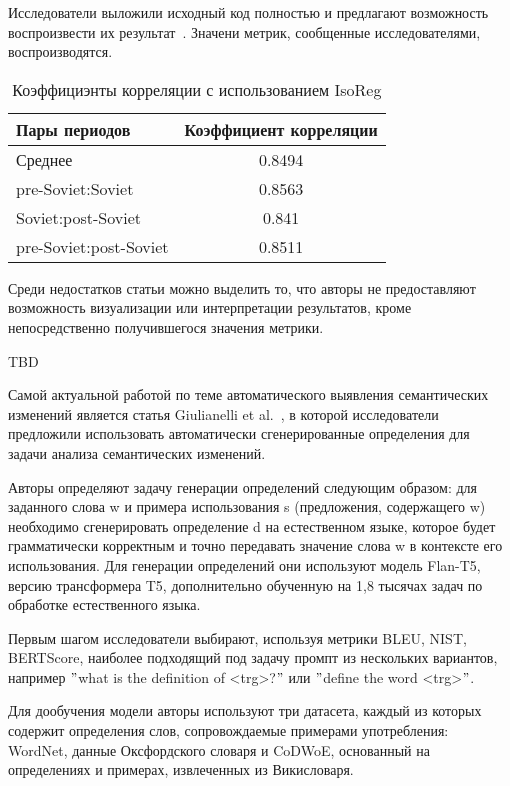 \documentclass[LI,VKR]{HSEUniversity}
\begin{document}
Исследователи выложили исходный код полностью и предлагают возможность воспроизвести их
результат~\cite{DeepMistakeGitHub}.
Значени метрик, сообщенные исследователями, воспроизводятся.

\begin{table}[htbp]
\centering
\caption{Коэффициэнты корреляции с использованием IsoReg}
\begin{tabular}{lc}
\hline
Пары периодов                  & Коэффициент корреляции \\
\hline
Среднее            & 0.8494                  \\
pre-Soviet:Soviet           & 0.8563                  \\
Soviet:post-Soviet          & 0.841                  \\
pre-Soviet:post-Soviet      & 0.8511                  \\
\hline
\end{tabular}
\end{table}

Среди недостатков статьи можно выделить то, что авторы не предоставляют возможность визуализации
или интерпретации результатов, кроме непосредственно получившегося значения метрики.

TBD

Самой актуальной работой по теме автоматического выявления семантических изменений является статья
Giulianelli et al.~\cite{DefinitionGenerationMainArticle}, в которой исследователи предложили
использовать автоматически сгенерированные определения для задачи анализа семантических изменений.

Авторы определяют задачу генерации определений следующим образом: для заданного слова w и примера
использования s (предложения, содержащего w) необходимо сгенерировать определение d на
естественном языке, которое будет грамматически корректным и точно передавать значение слова
w в контексте его использования.
Для генерации определений они используют модель Flan-T5, версию трансформера T5,
дополнительно обученную на 1,8 тысячах задач по обработке естественного языка.

Первым шагом исследователи выбирают, используя метрики BLEU, NIST, BERTScore, наиболее
подходящий под задачу промпт из нескольких вариантов, например
\("\)what is the definition of <trg>?\("\) или \("\)define the word <trg>\("\).

Для дообучения модели авторы используют три датасета, каждый из которых содержит определения
слов, сопровождаемые примерами употребления: WordNet, данные Оксфордского словаря и CoDWoE,
основанный на определениях и примерах, извлеченных из Викисловаря.
\end{document}
